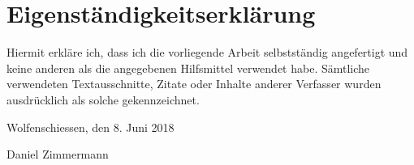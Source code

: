 \chapter*{Eigenständigkeitserklärung}

Hiermit erkläre ich, dass ich die vorliegende Arbeit selbstständig angefertigt und keine anderen als die
angegebenen Hilfsmittel verwendet habe. Sämtliche verwendeten Textausschnitte, Zitate oder Inhalte anderer
Verfasser wurden ausdrücklich als solche gekennzeichnet.

\vskip 1cm


Wolfenschiessen, den 8. Juni 2018

\vskip 1.5cm

Daniel Zimmermann